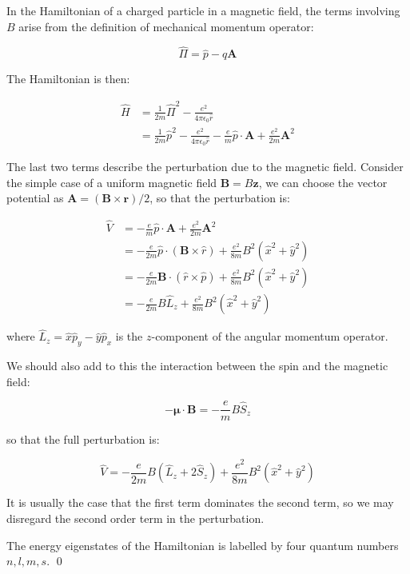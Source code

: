 \documentclass[12pt]{article}
\begin{document}
In the Hamiltonian of a charged particle in a magnetic field, the terms involving $B$ arise from the definition of mechanical momentum operator:

\begin{equation}
    \hat{\Pi} = \hat{p} - q \mathbf{A}
\end{equation}

The Hamiltonian is then:

\begin{equation}
    \begin{split}
        \hat{H} &= \frac{1}{2m} \hat{\Pi}^{2} - \frac{e^{2}}{4\pi \epsilon_{0} \hat{r}} \\
        &= \frac{1}{2m} \hat{p}^{2} - \frac{e^{2}}{4\pi \epsilon_{0} \hat{r}} - \frac{e}{m} \hat{p} \cdot \mathbf{A} + \frac{e^{2}}{2m} \mathbf{A}^{2}
    \end{split}
\end{equation}

The last two terms describe the perturbation due to the magnetic field. Consider the simple case of a uniform magnetic field $\mathbf{B} = B\mathbf{z}$, we can choose the vector potential as $\mathbf{A} = (\mathbf{B} \times \mathbf{r})/2$, so that the perturbation is:

\begin{equation}
    \begin{split}
        \hat{V} &= -\frac{e}{m} \hat{p} \cdot \mathbf{A} + \frac{e^{2}}{2m} \mathbf{A}^{2} \\
        &= -\frac{e}{2m} \hat{p} \cdot (\mathbf{B} \times \hat{r}) + \frac{e^{2}}{8m} B^{2} (\hat{x}^{2} + \hat{y}^{2}) \\
        &= -\frac{e}{2m} \mathbf{B} \cdot (\hat{r} \times \hat{p}) + \frac{e^{2}}{8m} B^{2} (\hat{x}^{2} + \hat{y}^{2}) \\
        &= -\frac{e}{2m} B \hat{L}_{z} + \frac{e^{2}}{8m} B^{2} (\hat{x}^{2} + \hat{y}^{2})
    \end{split}
\end{equation}

where $\hat{L}_{z} = \hat{x}\hat{p}_{y} - \hat{y}\hat{p}_{x}$ is the $z$-component of the angular momentum operator.

We should also add to this the interaction between the spin and the magnetic field:

\begin{equation}
    -\mathbf{\mu} \cdot \mathbf{B} = -\frac{e}{m} B \hat{S}_{z}
\end{equation}

so that the full perturbation is:

\begin{equation}
    \hat{V} = -\frac{e}{2m} B (\hat{L}_{z} + 2\hat{S}_{z}) + \frac{e^{2}}{8m} B^{2} (\hat{x}^{2} + \hat{y}^{2})
\end{equation}

It is usually the case that the first term dominates the second term, so we may disregard the second order term in the perturbation.

The energy eigenstates of the Hamiltonian is labelled by four quantum numbers $n, l, m, s$.
\qed
\end{document}
